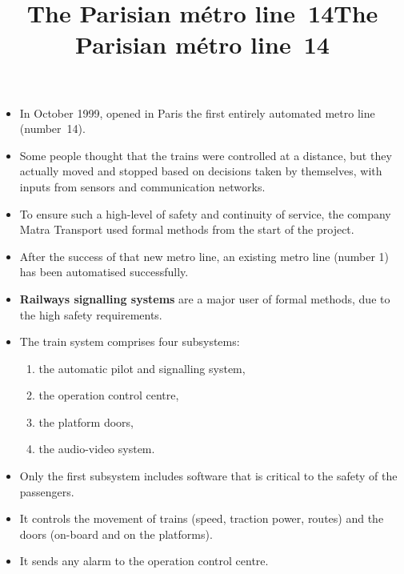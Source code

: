 \documentclass[wide]{slides}
\begin{document}
\begin{slide}
  \title{The Parisian m\'etro line~14}

  \begin{itemize}

    \item In October 1999, opened in Paris the first entirely
      automated metro line (number~14).

    \item Some people thought that the trains were controlled at a
      distance, but they actually moved and stopped based on decisions
      taken by themselves, with inputs from sensors and communication
      networks.

    \item To ensure such a high\hyp{}level of safety and continuity of
      service, the company Matra Transport used formal methods from
      the start of the project.

    \item After the success of that new metro line, an existing metro
      line (number 1) has been automatised successfully.

    \item \textbf{Railways signalling systems} are a major user of
      formal methods, due to the high safety requirements.

  \end{itemize}
\end{slide}

\begin{slide}
  \title{The Parisian m\'etro line~14}

  \begin{itemize}

    \item The train system comprises four subsystems:
      \begin{enumerate}

        \item the automatic pilot and signalling system,

        \item the operation control centre,

        \item the platform doors,

        \item the audio-video system.

      \end{enumerate}

    \item Only the first subsystem includes software that is critical
      to the safety of the passengers.

    \item It controls the movement of trains (speed, traction power,
      routes) and the doors (on\hyp{}board and on the platforms).

    \item It sends any alarm to the operation control centre.

  \end{itemize}

\end{slide}
\end{document}
